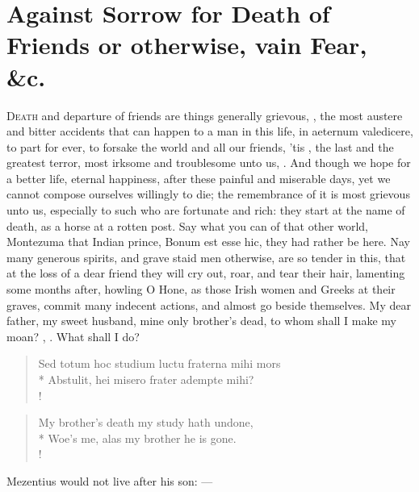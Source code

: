 {%

\section{Against Sorrow for Death of Friends or otherwise, vain Fear, \&c.}

\lettrine{D}{eath} and departure of friends are things generally grievous, 
, the most austere and bitter accidents that can happen to a
man in this life, in aeternum valedicere, to part for ever, to forsake
the world and all our friends, 'tis , the last and
the greatest terror, most irksome and troublesome unto us, . And though we hope for a better
life, eternal happiness, after these painful and miserable days, yet we
cannot compose ourselves willingly to die; the remembrance of it is
most grievous unto us, especially to such who are fortunate and rich:
they start at the name of death, as a horse at a rotten post. Say what
you can of that other world, Montezuma that Indian prince, Bonum
est esse hic, they had rather be here. Nay many generous spirits, and
grave staid men otherwise, are so tender in this, that at the loss of a
dear friend they will cry out, roar, and tear their hair, lamenting
some months after, howling O Hone, as those Irish women and
Greeks at their graves, commit many indecent actions, and almost
go beside themselves. My dear father, my sweet husband, mine only
brother's dead, to whom shall I make my moan? , \etc{}. What shall I do?
%
%
\begin{latin}%
\begin{verse}%
Sed totum hoc studium luctu fraterna mihi mors\\*
Abstulit, hei misero frater adempte mihi?\\!
\end{verse}%
\end{latin}%
\translationrule%
\begin{verse}%
My brother's death my study hath undone,\\*
Woe's me, alas my brother he is gone.\\!
\end{verse}%
%
Mezentius would not live after his son:
---

}
